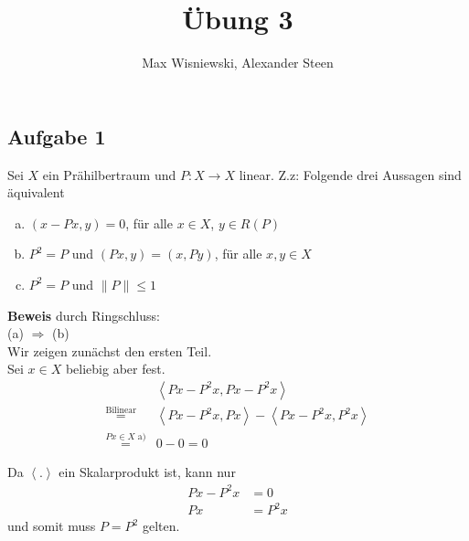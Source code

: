 \documentclass[11pt,a4paper,ngerman]{article}
\date{}
\title{Übung 3}
\author{Max Wisniewski, Alexander Steen}
\begin{document}

\renewcommand{\figurename}{Figure}

\maketitle
\thispagestyle{fancy}

\subsection*{Aufgabe 1}
Sei $X$ ein Prähilbertraum und $P: X \to X$ linear. Z.z: Folgende drei Aussagen sind äquivalent
\begin{enumerate}[(a)]
\item $(x-Px,y) = 0$, für alle $x \in X$, $y \in R(P)$ 
\item $P^2 = P$ und $(Px,y) = (x,Py)$, für alle $x,y \in X$ 
\item $P^2 = P$ und $\|P\| \leq 1$
\end{enumerate}
\textbf{Beweis} durch Ringschluss:\\
(a) $\Rightarrow$ (b) \\

Wir zeigen zunächst den ersten Teil.\\
Sei $x \in X$ beliebig aber fest.
\begin{equation*}\begin{array}{rl}
& \left\langle Px - P^2 x, Px - P^2 x \right\rangle\\
\stackrel{\text{Bilinear}}{=}&
    \left\langle Px - P^2 x, Px \right\rangle - \left\langle Px - P^2 x, P^2 x\right\rangle\\
\stackrel{Px \in X\text{ a)}}{=}&
    0 - 0 = 0
\end{array}\end{equation*}

Da $\left\langle . \right\rangle$ ein Skalarprodukt ist, kann nur
\begin{equation*}\begin{split}
    Px - P^2 x &= 0\\
    Px      &= P^2 x
\end{split}\end{equation*}
und somit muss $P = P^2$ gelten.\\
\end{document}
